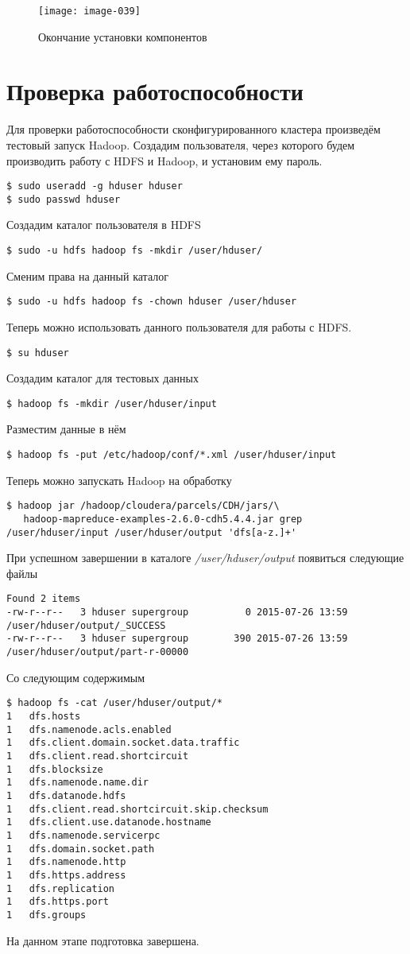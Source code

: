 \newpage

\begin{figure}[ht!]
    \center
    \texttt{[image: image-039]}
    \caption{Окончание установки компонентов}
    \label{img:last}
\end{figure}

\newpage

\section{Проверка работоспособности}
Для проверки работоспособности сконфигурированного кластера произведём тестовый запуск Hadoop. 
Создадим пользователя, через которого будем производить работу с HDFS и Hadoop, и установим ему пароль.
\begin{lstlisting}
$ sudo useradd -g hduser hduser
$ sudo passwd hduser
\end{lstlisting}
Создадим каталог пользователя в HDFS
\begin{lstlisting}
$ sudo -u hdfs hadoop fs -mkdir /user/hduser/
\end{lstlisting}
Сменим права на данный каталог
\begin{lstlisting}
$ sudo -u hdfs hadoop fs -chown hduser /user/hduser
\end{lstlisting}
Теперь можно использовать данного пользователя для работы с HDFS.
\begin{lstlisting}
$ su hduser
\end{lstlisting}
Создадим каталог для тестовых данных
\begin{lstlisting}
$ hadoop fs -mkdir /user/hduser/input
\end{lstlisting}
Разместим данные в нём
\begin{lstlisting}
$ hadoop fs -put /etc/hadoop/conf/*.xml /user/hduser/input 
\end{lstlisting}
Теперь можно запускать Hadoop на обработку
\begin{lstlisting}
$ hadoop jar /hadoop/cloudera/parcels/CDH/jars/\
   hadoop-mapreduce-examples-2.6.0-cdh5.4.4.jar grep /user/hduser/input /user/hduser/output 'dfs[a-z.]+'
\end{lstlisting}
При успешном завершении в каталоге \emph{/user/hduser/output} появиться следующие файлы
\begin{lstlisting}
Found 2 items
-rw-r--r--   3 hduser supergroup          0 2015-07-26 13:59 /user/hduser/output/_SUCCESS
-rw-r--r--   3 hduser supergroup        390 2015-07-26 13:59 /user/hduser/output/part-r-00000
\end{lstlisting}
Со следующим содержимым
\begin{lstlisting}
$ hadoop fs -cat /user/hduser/output/*
1   dfs.hosts
1   dfs.namenode.acls.enabled
1   dfs.client.domain.socket.data.traffic
1   dfs.client.read.shortcircuit
1   dfs.blocksize
1   dfs.namenode.name.dir
1   dfs.datanode.hdfs
1   dfs.client.read.shortcircuit.skip.checksum
1   dfs.client.use.datanode.hostname
1   dfs.namenode.servicerpc
1   dfs.domain.socket.path
1   dfs.namenode.http
1   dfs.https.address
1   dfs.replication
1   dfs.https.port
1   dfs.groups
\end{lstlisting}
На данном этапе подготовка завершена.

